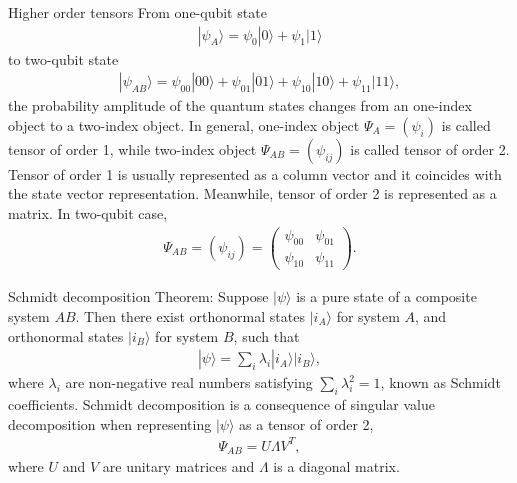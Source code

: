 \documentclass{beamer}
\begin{document}
\begin{frame}{Higher order tensors}
\justify
From one-qubit state
\begin{align}
|\psi_A\rangle = \psi_0 |0\rangle + \psi_1 |1\rangle
\end{align}
to two-qubit state
\begin{align}
|\psi_{AB}\rangle = \psi_{00} |00\rangle + \psi_{01} |01\rangle + \psi_{10} |10\rangle + \psi_{11} |11\rangle,
\end{align}
the probability amplitude of the quantum states changes from an one-index object to a two-index object.
\vfill
In general, one-index object $\Psi_A = (\psi_i)$ is called tensor of order 1, while two-index object $\Psi_{AB} = (\psi_{ij})$ is called tensor of order 2.
\vfill
Tensor of order 1 is usually represented as a column vector and it coincides with the state vector representation.
\vfill
Meanwhile, tensor of order 2 is represented as a matrix. In two-qubit case,
\begin{align}
\Psi_{AB} = (\psi_{ij}) = \begin{pmatrix}
\psi_{00} & \psi_{01} \\ \psi_{10} & \psi_{11}
\end{pmatrix}.
\end{align}
\end{frame}

\begin{frame}{Schmidt decomposition}
\justify
Theorem: Suppose $|\psi\rangle$ is a pure state of a composite system $AB$. Then there exist orthonormal states $|i_A\rangle$ for system $A$, and orthonormal states $|i_B\rangle$ for system $B$, such that
\begin{align}
|\psi\rangle = \sum_i \lambda_i |i_A\rangle |i_B\rangle,
\end{align}
where $\lambda_i$ are non-negative real numbers satisfying $\sum_i \lambda_i^2 = 1$, known as Schmidt coefficients.
\vfill
Schmidt decomposition is a consequence of singular value decomposition when representing $|\psi\rangle$ as a tensor of order 2,
\begin{align}
\Psi_{AB} = U \Lambda V^T,
\end{align}
where $U$ and $V$ are unitary matrices and $\Lambda$ is a diagonal matrix.
\end{frame}
\end{document}
